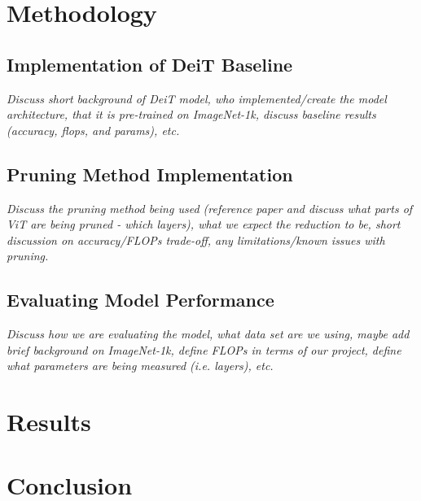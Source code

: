 \documentclass[10pt,twocolumn,letterpaper]{article}
\begin{document}
\section{Methodology}
\label{sec:related work}

\subsection{Implementation of DeiT Baseline}
\textit{Discuss short background of DeiT model, who implemented/create the model architecture, that it is pre-trained on ImageNet-1k, discuss baseline results (accuracy, flops, and params), etc. }

\subsection{Pruning Method Implementation}
\textit{Discuss the pruning method being used (reference paper and discuss what parts of ViT are being pruned - which layers), what we expect the reduction to be, short discussion on accuracy/FLOPs trade-off, any limitations/known issues with pruning.}

\subsection{Evaluating Model Performance}
\textit{Discuss how we are evaluating the model, what data set are we using, maybe add brief background on ImageNet-1k, define FLOPs in terms of our project, define what parameters are being measured (i.e. layers), etc.}


\section{Results}
\label{sec:results}


\section{Conclusion}
\label{sec:conclsion}


{\small


}

\end{document}
